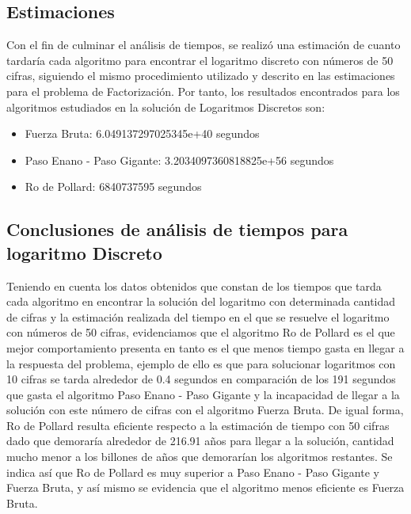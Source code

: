 \documentclass{article}
\begin{document}
    \subsection*{Estimaciones}
    Con el fin de culminar el análisis de tiempos, se realizó una estimación de cuanto tardaría cada algoritmo para encontrar el logaritmo discreto con números de 50 cifras, siguiendo el mismo procedimiento utilizado y descrito en las estimaciones para el problema de Factorización. 
    \newblock
    Por tanto, los resultados encontrados para los algoritmos estudiados en la solución de Logaritmos Discretos son:
    \begin{itemize}
        \item Fuerza Bruta: 6.049137297025345e+40 segundos
        \item Paso Enano - Paso Gigante: 3.2034097360818825e+56 segundos
        \item Ro de Pollard: 6840737595 segundos
    \end{itemize}
    
    \subsection*{Conclusiones de análisis de tiempos para logaritmo Discreto}
    Teniendo en cuenta los datos obtenidos que constan de los tiempos que tarda cada algoritmo en encontrar la solución del logaritmo con determinada cantidad de cifras y la estimación realizada del tiempo en el que se resuelve el logaritmo con números de 50 cifras, evidenciamos que el algoritmo Ro de Pollard es el que mejor comportamiento presenta en tanto es el que menos tiempo gasta en llegar a la respuesta del problema, ejemplo de ello es que para solucionar logaritmos con 10 cifras se tarda alrededor de 0.4 segundos en comparación de los 191 segundos que gasta el algoritmo Paso Enano - Paso Gigante y la incapacidad de llegar a la solución con este número de cifras con el algoritmo Fuerza Bruta.
    \newblock
    De igual forma, Ro de Pollard resulta eficiente respecto a la estimación de tiempo con 50 cifras dado que demoraría alrededor de 216.91 años para llegar a la solución, cantidad mucho menor a los billones de años que demorarían los algoritmos restantes.
    \newblock
    Se indica así que Ro de Pollard es muy superior a Paso Enano - Paso Gigante y Fuerza Bruta, y así mismo se evidencia que el algoritmo menos eficiente es Fuerza Bruta.
    
    
\end{document}
